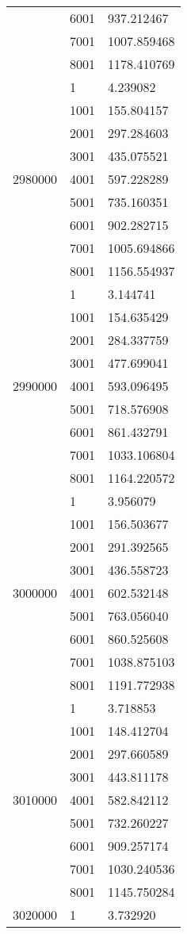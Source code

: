 \begin{table}[htb!]
\begin{tabular}{lll}
 & 6001 & 937.212467 \\
 & 7001 & 1007.859468 \\
 & 8001 & 1178.410769 \\
\multirow[c]{9}{*}{2980000} & 1 & 4.239082 \\
 & 1001 & 155.804157 \\
 & 2001 & 297.284603 \\
 & 3001 & 435.075521 \\
 & 4001 & 597.228289 \\
 & 5001 & 735.160351 \\
 & 6001 & 902.282715 \\
 & 7001 & 1005.694866 \\
 & 8001 & 1156.554937 \\
\multirow[c]{9}{*}{2990000} & 1 & 3.144741 \\
 & 1001 & 154.635429 \\
 & 2001 & 284.337759 \\
 & 3001 & 477.699041 \\
 & 4001 & 593.096495 \\
 & 5001 & 718.576908 \\
 & 6001 & 861.432791 \\
 & 7001 & 1033.106804 \\
 & 8001 & 1164.220572 \\
\multirow[c]{9}{*}{3000000} & 1 & 3.956079 \\
 & 1001 & 156.503677 \\
 & 2001 & 291.392565 \\
 & 3001 & 436.558723 \\
 & 4001 & 602.532148 \\
 & 5001 & 763.056040 \\
 & 6001 & 860.525608 \\
 & 7001 & 1038.875103 \\
 & 8001 & 1191.772938 \\
\multirow[c]{9}{*}{3010000} & 1 & 3.718853 \\
 & 1001 & 148.412704 \\
 & 2001 & 297.660589 \\
 & 3001 & 443.811178 \\
 & 4001 & 582.842112 \\
 & 5001 & 732.260227 \\
 & 6001 & 909.257174 \\
 & 7001 & 1030.240536 \\
 & 8001 & 1145.750284 \\
\multirow[c]{9}{*}{3020000} & 1 & 3.732920 \\

\end{tabular}
\end{table}
